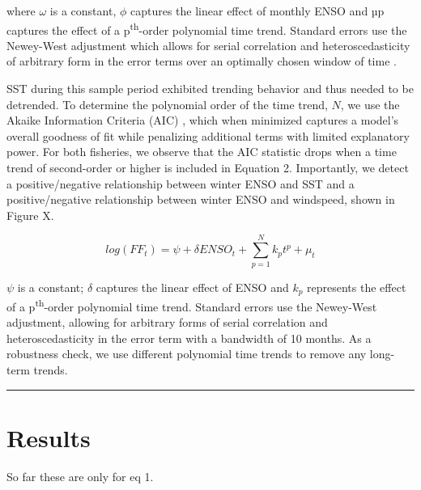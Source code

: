 \documentclass[]{article}
\begin{document}
where \(\omega\) is a constant, \(\phi\) captures the linear effect of
monthly ENSO and µp captures the effect of a p\textsuperscript{th}-order
polynomial time trend. Standard errors use the Newey-West adjustment
which allows for serial correlation and heteroscedasticity of arbitrary
form in the error terms over an optimally chosen window of time
\citep{newey_1987,newey_1994}.

SST during this sample period exhibited trending behavior and thus
needed to be detrended. To determine the polynomial order of the time
trend, \(N\), we use the Akaike Information Criteria (AIC)
\citep{akaike_1974}, which when minimized captures a model's overall
goodness of fit while penalizing additional terms with limited
explanatory power. For both fisheries, we observe that the AIC statistic
drops when a time trend of second-order or higher is included in
Equation 2. Importantly, we detect a positive/negative relationship
between winter ENSO and SST and a positive/negative relationship between
winter ENSO and windspeed, shown in Figure X.

\[log(FF_t) = \psi + \delta ENSO_t + \sum_{p = 1}^{N}{k_pt^p} + \mu_t\]

\(\psi\) is a constant; \(\delta\) captures the linear effect of ENSO
and \(k_p\) represents the effect of a p\textsuperscript{th}-order
polynomial time trend. Standard errors use the Newey-West adjustment,
allowing for arbitrary forms of serial correlation and
heteroscedasticity in the error term with a bandwidth of 10 months. As a
robustness check, we use different polynomial time trends to remove any
long-term trends.

\begin{center}\rule{0.5\linewidth}{\linethickness}\end{center}

\section{Results}\label{results}

So far these are only for eq 1.
\end{document}
